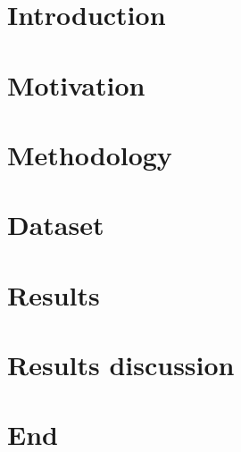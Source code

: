 \newpage

\section{Introduction}

\section{Motivation}

\section{Methodology}

\section{Dataset}

\section{Results}

\section{Results discussion}

\section{End}
